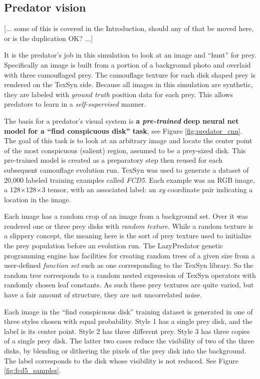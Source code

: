 \documentclass[sigconf]{acmart}
\newcommand{\jargon}[1]{\textit{#1}}
\begin{document}
\subsection{Predator vision}
[... some of this is covered in the Introduction, should any of that be moved here, or is the duplication OK? ...]
\par
It is the predator's job in this simulation to look at an image and “hunt” for prey. Specifically an image is built from a portion of a background photo and overlaid with three camouflaged prey. The camouflage texture for each disk shaped prey is rendered on the TexSyn side. Because all images in this simulation are synthetic, they are labeled with \jargon{ground truth} position data for each prey. This allows predators to learn in a \jargon{self-supervised} manner.
\par
The basis for a predator's visual system is \textbf{a \jargon{pre-trained} deep neural net model for a “find conspicuous disk” task}, see Figure \ref{fig:predator_cnn}. The goal of this task is to look at an arbitrary image and locate the center point of the most conspicuous (salient) region, assumed to be a prey-sized disk. This pre-trained model is created as a preparatory step then reused for each subsequent camouflage evolution run. TexSyn was used to generate a dataset of 20,000 labeled training examples called \jargon{FCD5}. Each example was an RGB image, a 128×128×3 tensor, with an associated label: an \textit{xy} coordinate pair indicating a location in the image.
\par
Each image has a random crop of an image from a background set. Over it was rendered one or three prey disks with \jargon{random texture}. While a random texture is a slippery concept, the meaning here is the sort of prey texture used to initialize the prey population before an evolution run. The LazyPredator genetic programming engine has facilities for creating random trees of a given size from a user-defined \jargon{function set} such as one corresponding to the TexSyn library. So the random tree corresponds to a random nested expression of TexSyn operators with randomly chosen leaf constants. As such these prey textures are quite varied, but have a fair amount of structure, they are not uncorrelated noise.
\par
Each image in the “find conspicuous disk” training dataset is generated in one of three styles chosen with equal probability. Style 1 has a single prey disk, and the label is its center point. Style 2 has three different prey. Style 3 has three copies of a single prey disk. The latter two cases reduce the visibility of two of the three disks, by blending or dithering the pixels of the prey disk into the background. The label corresponds to the disk whose visibility is not reduced. See Figure \ref{fig:fcd5_samples}.
\end{document}
